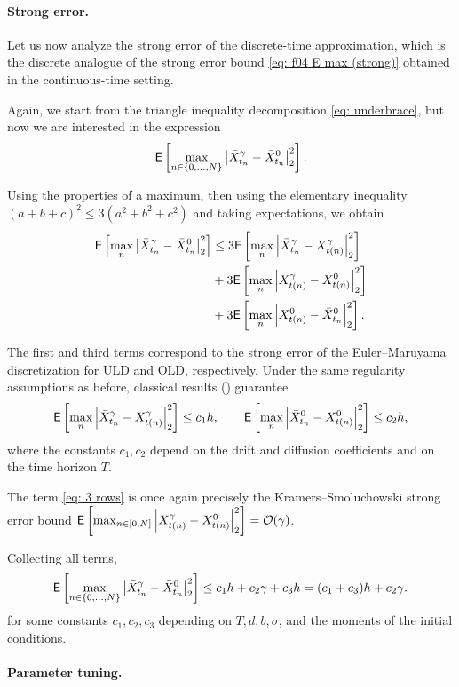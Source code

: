 \documentclass[12pt]{article}
\begin{document}
\paragraph{Strong error.}
Let us now analyze the strong error of the discrete-time approximation, which is the discrete analogue of the strong error bound \eqref{eq: f04 E max (strong)} obtained in the continuous-time setting.

Again, we start from the triangle inequality decomposition \eqref{eq: underbrace}, but now we are interested in the expression
\[
{\mathsf E}\left[\max_{n\in\{0, \ldots, N\}}\left|\bar{X}_{t_n}^\gamma - \bar{X}_{t_n}^0\right|_2^2\right].
\]

Using the properties of a maximum, then using the elementary inequality $(a+b+c)^2 \leq 3(a^2+b^2+c^2)$ and taking expectations, we obtain
\begin{align}
    \label{eq: 3 rows}
    {\mathsf E}\left[\max_n \left|\bar{X}_{t_n}^\gamma - \bar{X}_{t_n}^0\right|_2^2\right]&\leq 3{\mathsf E}\left[\max_n \left| \bar{X}_{t_n}^\gamma - X_{t(n)}^\gamma \right|_2^2\right]\nonumber\\
    &+3{\mathsf E}\left[\max_n \left| X_{t(n)}^\gamma - X_{t(n)}^0 \right|_2^2\right]\\
    &+3{\mathsf E}\left[\max_n \left| X_{t(n)}^0 - \bar{X}_{t_n}^0 \right|_2^2\right].\nonumber
\end{align}

The first and third terms correspond to the strong error of the Euler--Maruyama discretization for ULD and OLD, respectively. Under the same regularity assumptions as before, classical results (\cite{kloeden1992numerical}) guarantee
\[
{\mathsf E}\left[\max_{n}\left| \bar{X}_{t_n}^\gamma - X_{t(n)}^\gamma \right|_2^2\right] \leq c_1 h,
\qquad
{\mathsf E}\left[\max_{n}\left| \bar{X}_{t_n}^0 - X_{t(n)}^0 \right|_2^2\right] \leq c_2 h,
\]
where the constants $c_1, c_2$ depend on the drift and diffusion coefficients and on the time horizon $T$.

The term \eqref{eq: 3 rows} is once again precisely the Kramers--Smoluchowski strong error bound ${\mathsf E}\left[\max_{n\in[0, N]}\left| X_{t(n)}^\gamma - X_{t(n)}^0 \right|_2^2\right] = \mathcal{O}(\gamma)$.

Collecting all terms,
\[
{\mathsf E}\left[\max_{n\in\{0,\ldots,N\}} \left|\bar{X}_{t_n}^\gamma - \bar{X}_{t_n}^0\right|_2^2\right]
\leq c_1 h + c_2 \gamma + c_3 h = (c_1 + c_3)h + c_2 \gamma.
\]
for some constants $c_1, c_2, c_3$ depending on $T, d, b, \sigma$, and the moments of the initial conditions.

\paragraph{Parameter tuning.}
\end{document}
